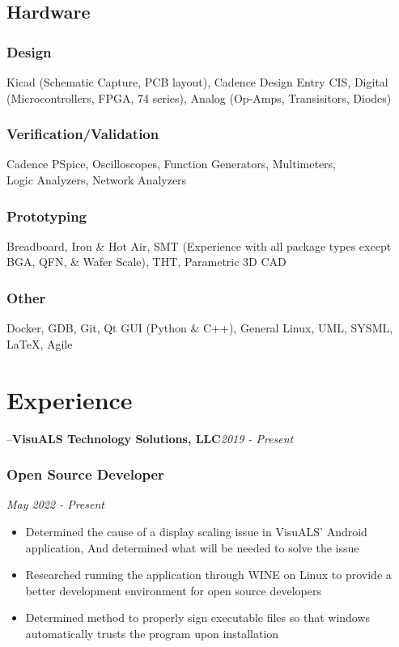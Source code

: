 \documentclass{article}
\newcommand{\companyHeader}[2]{--\large{\bfseries{#1}}\hfill \small{\textsl{#2}}}
\begin{document}
\begin{spacing}{.5}
	\subsection{Hardware}
		\subsubsection{Design} \large{\hspace*{2pt} Kicad} \small{(Schematic Capture, PCB layout),} \large{Cadence Design Entry CIS, Digital} \small{(Microcontrollers, FPGA, 74 series), } \hspace*{.45cm}  \large{Analog} \small{(Op-Amps, Transisitors, Diodes)}
		\subsubsection{Verification/Validation} \large{\hspace*{2pt} Cadence PSpice, Oscilloscopes, Function Generators, Multimeters,\\ \hspace*{.45cm} Logic Analyzers, Network Analyzers}
		\subsubsection{Prototyping} \large{\hspace*{2pt} Breadboard, Iron \& Hot Air, SMT} \small{(Experience with all package types except BGA, QFN, \& Wafer Scale),} \large{ \hspace*{.45cm} THT, Parametric 3D CAD}

		\subsubsection{Other} \large{\hspace*{2pt} Docker, GDB, Git, Qt GUI} \small{(Python \& C++), } \large{General Linux, UML, SYSML, \LaTeX, Agile}

\section{Experience}
	\companyHeader{VisuALS Technology Solutions, LLC}{2019 - Present}
		\subsubsection{\large{Open Source Developer}} \hfill \small{\textsl{May 2022 - Present}}
			\begin{itemize}[label=--,itemsep=-.35ex]
				\item \large{Determined the cause of a display scaling issue in VisuALS' Android application, And determined what will be needed to solve the issue}
				\item \large{Researched running the application through WINE on Linux to provide a better development environment for open source developers}
				\item \large{Determined method to properly sign executable files so that windows automatically trusts the program upon installation}
			\end{itemize}

\end{spacing}
\end{document}
